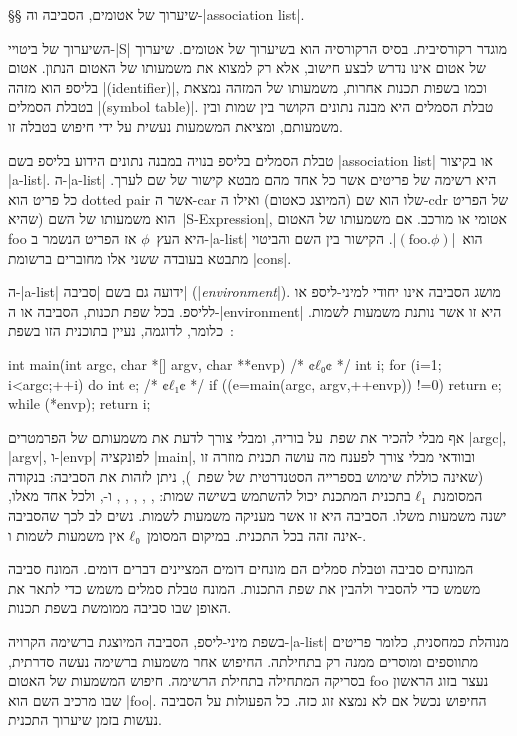 §§ שיערוך של אטומים, הסביבה וה-\E|association list|.

השיערוך של ביטויי-\E|S| מוגדר רקורסיבית. בסיס הרקורסיה הוא בשיערוך של אטומים.
שיערוך של אטום אינו נדרש לבצע חישוב, אלא רק למצוא את משמעותו של האטום הנתון.
אטום בליספ הוא מזהה \E|(identifier)|, וכמו בשפות תכנות אחרות, משמעותו של המזהה
נמצאת בטבלת הסמלים \E|(symbol table)|. טבלת הסמלים היא מבנה נתונים הקושר בין
שמות ובין משמעותם, ומציאת המשמעות נעשית על ידי חיפוש בטבלה זו.

טבלת הסמלים בליספ בנויה במבנה נתונים הידוע בליספ בשם \E|association list|
או בקיצור \E|a-list|. ה-\E|a-list| היא רשימה של פריטים אשר כל אחד מהם מבטא
קישור של שם לערך. כל פריט הוא dotted pair אשר ה-car שלו הוא שם (המיוצג כאטום)
ואילו ה-cdr של הפריט הוא משמעותו של השם (שהיא~\E|S-Expression|, אטומי או מורכב.
אם משמעותו של האטום foo היא העץ~$ϕ$ אז הפריט הנשמר ב-\E|a-list|
הוא~\E|$(\text{foo}.ϕ)$|. הקישור בין השם והביטוי מתבטא בעובדה ששני אלו מחוברים
ברשומת \E|cons|.

ה-\E|a-list| ידועה גם בשם \ע|סביבה| (\E|\emph{environment}|). מושג הסביבה אינו
יחודי למיני-ליספ או לליספ. בכל שפת תכנות, הסביבה או ה-\E|environment| היא זו
אשר נותנת משמעות לשמות. כלומר, לדוגמה, נעיין בתוכנית הזו בשפת~\CPL:
\begin{CPP}
int main(int argc, char *[] argv, char **envp) {
  /* ¢$ℓ₀$¢ */ int i;
  for (i=1; i<argc;++i) {
    do {
      int e;
      /* ¢$ℓ₁$¢ */ if ((e=main(argc, argv,++envp)) !=0)
        return e;
    } while (*envp);
  }
  return i;
}
\end{CPP}
אף מבלי להכיר את שפת~\CPL על בוריה, ומבלי צורך לדעת את משמעותם של הפרמטרים
\E|argc|, \E|argv|, ו-\E|envp| לפונקציה \E|main|, ובוודאי מבלי צורך לפענח מה
עושה תכנית מוזרה זו (שאינה כוללת שימוש בספרייה הסטנדרטית של שפת~\CPL), ניתן
לזהות את הסביבה: בנקודה המסומנת~$ℓ₁$ בתכנית המתכנת יכול להשתמש בשישה שמות:
, , , , , ו-, ולכל
אחד מאלו, ישנה משמעות משלו. הסביבה היא זו אשר מעניקה משמעות לשמות.
נשים לב לכך שהסביבה אינה זהה בכל התכנית. במיקום המסומן~$ℓ₀$ אין משמעות
לשמות  ו-.

המונחים סביבה וטבלת סמלים הם מונחים דומים המציינים דברים דומים. המונח סביבה
משמש כדי להסביר ולהבין את שפת התכנות. המונח טבלת סמלים משמש כדי לתאר את האופן שבו
סביבה ממומשת בשפת תכנות.

בשפת מיני-ליספ, הסביבה המיוצגת ברשימה הקרויה-\E|a-list| מנוהלת כמחסנית, כלומר
פריטים מתווספים ומוסרים ממנה רק בתחילתה. החיפוש אחר משמעות ברשימה נעשה סדרתית,
בסריקה המתחילה בתחילת הרשימה. חיפוש המשמעות של האטום foo נעצר בזוג הראשון שבו
מרכיב השם הוא \E|foo|. החיפוש נכשל אם לא נמצא זוג כזה. כל הפעולות על הסביבה
נעשות בזמן שיערוך התכנית.

